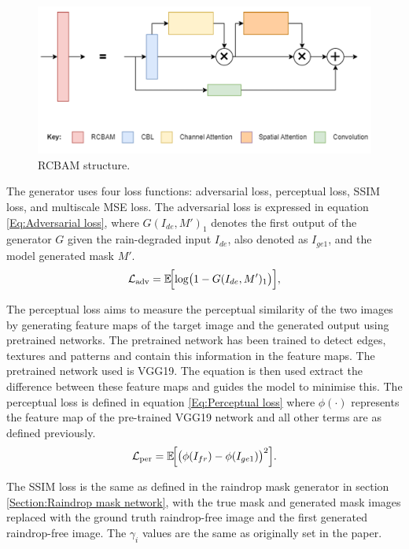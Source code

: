 \documentclass[11pt]{ociamthesis}  %
\begin{document}
\begin{figure}
    \centering
    \includegraphics[width=0.5\linewidth]{figures/Kwon-et-al-RCBAM.png}
    \caption{RCBAM structure.}
    \label{fig:RCBAM architeture}
\end{figure}

The generator uses four loss functions: adversarial loss, perceptual loss, SSIM loss, and multiscale MSE loss. The adversarial loss is expressed in equation \ref{Eq:Adversarial loss}, where \( G(I_{de}, M')_1 \) denotes the first output of the generator \( G \) given the rain-degraded input \( I_{de} \), also denoted as $I_{ge1}$, and the model generated mask \( M' \). 
\noindent
\begin{equation}
\mathcal{L}_{\text{adv}}
= \mathbb{E}\!\Bigl[\log \bigl(1 - G(I_{de}, M')_1\bigr)\Bigr],
\label{Eq:Adversarial loss}
\end{equation}
 
The perceptual loss aims to measure the perceptual similarity of the two images by generating feature maps of the target image and the generated output using pretrained networks. The pretrained network has been trained to detect edges, textures and patterns and contain this information in the feature maps. The pretrained network used is VGG19\cite{simonyan2014vgg}. The equation is then used extract the difference between these feature maps and guides the model to minimise this. The perceptual loss is defined in equation \ref{Eq:Perceptual loss} where $\phi(\cdot)$ represents the feature map of the pre-trained VGG19 network and all other terms are as defined previously.
\noindent
\begin{equation}
\mathcal{L}_{\text{per}} = \mathbb{E}\!\Bigl[\bigl(\phi(I_{fr}) - \phi(I_{ge1})\bigr)^2\Bigr].
\label{Eq:Perceptual loss}
\end{equation}

The SSIM loss is the same as defined in the raindrop mask generator in section \ref{Section:Raindrop mask network}, with the true mask and generated mask images replaced with the ground truth raindrop-free image and the first generated raindrop-free image. The $\gamma_i$ values are the same as originally set in the paper.
\end{document}
